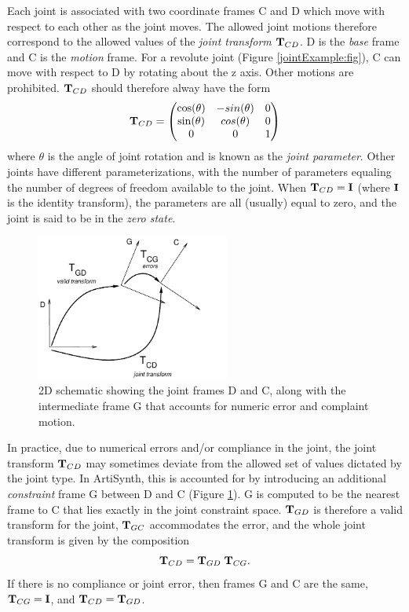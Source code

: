 Each joint is associated with two coordinate frames C and D which move
with respect to each other as the joint moves. The allowed joint
motions therefore correspond to the allowed values of the {\it joint transform}
${\bf T}_{CD}$.  D is the {\it base} frame and C is the {\it motion}
frame. For a revolute joint (Figure \ref{jointExample:fig}), C can
move with respect to D by rotating about the z axis. Other motions are
prohibited. ${\bf T}_{CD}$ should therefore alway have the form
%
\begin{equation}
{\bf T}_{CD} = \left(\begin{matrix}
\cos(\theta) & -sin(\theta) & 0 \\
\sin(\theta) &  cos(\theta) & 0 \\
0 & 0 & 1\\
\end{matrix}\right)
\end{equation}
%
where $\theta$ is the angle of joint rotation and is known as the {\it
joint parameter}. Other joints have different parameterizations, with
the number of parameters equaling the number of degrees of freedom
available to the joint. When ${\bf T}_{CD} = {\bf I}$ (where ${\bf I}$ is the
identity transform), the parameters are all (usually) equal to zero,
and the joint is said to be in the {\it zero state}.

\begin{figure}[ht]
\begin{center}
 \includegraphics[width=2.5in]{images/jointFrames}
\end{center}
\caption{2D schematic showing the joint frames D and C, along with
the intermediate frame G that accounts for numeric error
and complaint motion.}
\label{jointFrames:fig}
\end{figure}

In practice, due to numerical errors and/or compliance in the joint,
the joint transform ${\bf T}_{CD}$ may
sometimes deviate from the allowed set of values dictated by the joint
type. In ArtiSynth, this is accounted for by introducing an additional
{\it constraint} frame G between D and C (Figure \ref{jointFrames:fig}).
G is computed to be the nearest frame to C that lies exactly 
in the joint constraint space. ${\bf T}_{GD}$ is therefore a
valid transform for the joint, ${\bf T}_{GC}$ accommodates the error,
and the whole joint transform is given by the composition
%
\begin{equation}
{\bf T}_{CD} = {\bf T}_{GD} \; {\bf T}_{CG}.
\end{equation}
%
If there is no compliance or joint error, then frames G and C are the
same, ${\bf T}_{CG} = {\bf I}$, and ${\bf T}_{CD} = {\bf T}_{GD}$.

